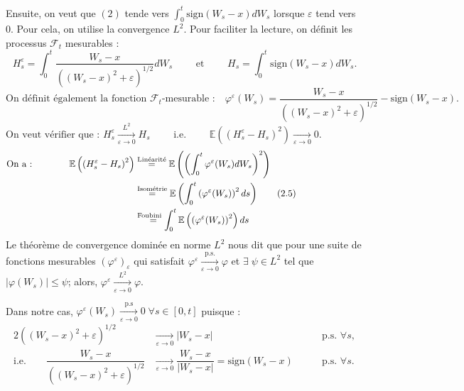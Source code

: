 \documentclass[openany]{book}
\makeatletter
\newcommand{\F}{\mathscr{F}}
\newcommand{\E}{\mathbb{E}}
\newcommand{\1}{\mathbbm{1}}
\newcommand{\sign}{\text{sign}}
\renewenvironment{proof}[1][\textbf{\textit{Démonstration}}]{%
  \par\pushQED{\qed}%
  \normalfont\topsep6\p@\@plus6\p@\relax
  \trivlist\item[\hskip\labelsep
    #1\@addpunct{.}]\ignorespaces
}{%
  \popQED\endtrivlist\@endpefalse
}
\theoremstyle{thmfont}
\theoremstyle{deffont}
\theoremstyle{thmfont}
\theoremstyle{deffont}
\makeatother
\begin{document}
\begin{proof}
  
  \noindent Ensuite, on veut que $(2)$ tende vers $\int_0^t \sign(W_s-x)dW_s$ lorsque $\varepsilon$ tend vers $0$. Pour cela, on utilise la convergence $L^2$. Pour faciliter la lecture, on définit les processus $\F_t$ mesurables :
  $$H^\varepsilon_s = \int_0^t \dfrac{W_s-x}{((W_s-x)^2 +\varepsilon)^{1/2}}dW_s \qquad\text{ et }\qquad H_s =  \int_0^t \sign(W_s -x)dW_s.$$\vspace{-4mm}
  $$\text{On définit également la fonction $\F_t$-mesurable :}\quad\varphi^\varepsilon(W_s) =  \dfrac{W_s-x}{((W_s-x)^2 +\varepsilon)^{1/2}} - \sign(W_s -x).\qquad\qquad\qquad\qquad\qquad\qquad$$
  $$\text{On veut vérifier que : }H^\varepsilon_s \xrightarrow[\varepsilon \to 0]{L^2} H_s \qquad \text{ i.e. } \qquad \E\left(\left(H^\varepsilon_s - H_s\right)^2\right) \xrightarrow[\varepsilon \to 0]{} 0.\qquad\qquad\qquad\qquad\qquad\qquad$$
\begin{align*}\label{arg:cvL2}
  \text{On a :}\qquad\qquad
  \E\left(\left(H^\varepsilon_s - H_s\right)^2\right) &\overset{\text{Linéarité}}{=} \E \left( \left(\int_0^t\varphi^\varepsilon(W_s)dW_s\right)^2 \right)\qquad\qquad\qquad\qquad\qquad\\
  &\overset{\text{Isométrie}}{=} \E\left( \int_0^t\left( \varphi^\varepsilon(W_s) \right)^2 ds\right) \tag{2.5}\refstepcounter{equation}\\
  &\overset{\text{Foubini}}{\;\;\;=}\int_0^t\E\left( \left(\varphi^\varepsilon(W_s)\right)^2 \right)ds\\
\end{align*}
\noindent Le théorème de convergence dominée en norme $L^2$ nous dit que pour une suite de fonctions mesurables $(\varphi^\varepsilon)_\varepsilon$ qui satisfait $\varphi^\varepsilon \xrightarrow[\varepsilon\to0]{\text{p.s.}}\varphi$ et $\exists\; \psi \in L^2$ tel que $|\varphi(W_s)| \leq \psi$; alors, $\varphi^\varepsilon \xrightarrow[\varepsilon \to 0]{L^2} \varphi$.


\noindent Dans notre cas, $\varphi^\varepsilon(W_s) \xrightarrow[\varepsilon \to 0]{\text{p.s}} 0\;\forall s \in [0,t]$ puisque :
\begin{alignat*}{2}
((W_s-x)^2 +\varepsilon)^{1/2} &\xrightarrow[\varepsilon\to 0]{} |W_s - x| \;\quad&&\text{p.s. } \forall s,\\
\text{i.e.}\qquad \dfrac{W_s-x}{((W_s-x)^2 +\varepsilon)^{1/2}} &\xrightarrow[\varepsilon \to 0]{} \dfrac{W_s-x}{|W_s - x|} = \sign(W_s -x)\quad\;&&\text{p.s. } \forall s.
\end{alignat*}


\end{proof}
\end{document}
